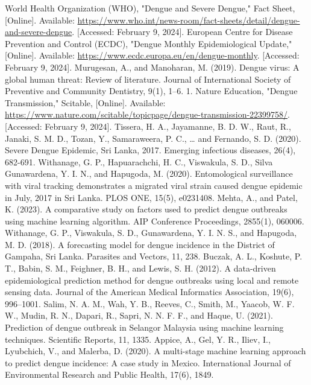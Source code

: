 \documentclass[conference]{IEEEtran}
\begin{document}
\begin{thebibliography}{00}
     World Health Organization (WHO), "Dengue and Severe Dengue," Fact Sheet, [Online]. Available: \url{https://www.who.int/news-room/fact-sheets/detail/dengue-and-severe-dengue}. [Accessed: February 9, 2024].
     European Centre for Disease Prevention and Control (ECDC), "Dengue Monthly Epidemiological Update," [Online]. Available: \url{https://www.ecdc.europa.eu/en/dengue-monthly}. [Accessed: February 9, 2024].
     Murugesan, A., and Manoharan, M. (2019). Dengue virus: A global human threat: Review of literature. Journal of International Society of Preventive and Community Dentistry, 9(1), 1–6. 1.
     Nature Education, "Dengue Transmission," Scitable, [Online]. Available: \url{https://www.nature.com/scitable/topicpage/dengue-transmission-22399758/}. [Accessed: February 9, 2024].
     Tissera, H. A., Jayamanne, B. D. W., Raut, R., Janaki, S. M. D., Tozan, Y., Samaraweera, P. C., … and Fernando, S. D. (2020). Severe Dengue Epidemic, Sri Lanka, 2017. Emerging infectious diseases, 26(4), 682-691.
     Withanage, G. P., Hapuarachchi, H. C., Viswakula, S. D., Silva Gunawardena, Y. I. N., and Hapugoda, M. (2020). Entomological surveillance with viral tracking demonstrates a migrated viral strain caused dengue epidemic in July, 2017 in Sri Lanka. PLOS ONE, 15(5), e0231408.
     Mehta, A., and Patel, K. (2023). A comparative study on factors used to predict dengue outbreaks using machine learning algorithm. AIP Conference Proceedings, 2855(1), 060006.
     Withanage, G. P., Viswakula, S. D., Gunawardena, Y. I. N. S., and Hapugoda, M. D. (2018). A forecasting model for dengue incidence in the District of Gampaha, Sri Lanka. Parasites and Vectors, 11, 238.
     Buczak, A. L., Koshute, P. T., Babin, S. M., Feighner, B. H., and Lewis, S. H. (2012). A data-driven epidemiological prediction method for dengue outbreaks using local and remote sensing data. Journal of the American Medical Informatics Association, 19(6), 996–1001.
     Salim, N. A. M., Wah, Y. B., Reeves, C., Smith, M., Yaacob, W. F. W., Mudin, R. N., Dapari, R., Sapri, N. N. F. F., and Haque, U. (2021). Prediction of dengue outbreak in Selangor Malaysia using machine learning techniques. Scientific Reports, 11, 1335.
     Appice, A., Gel, Y. R., Iliev, I., Lyubchich, V., and Malerba, D. (2020). A multi-stage machine learning approach to predict dengue incidence: A case study in Mexico. International Journal of Environmental Research and Public Health, 17(6), 1849.

\end{thebibliography}
\end{document}
